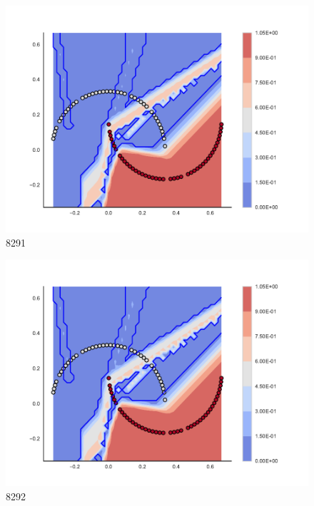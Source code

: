\begin{subfigure}[b]{0.09\textwidth}
    \includegraphics[clip, trim=2.35cm 1.75cm 4.5cm 0cm,width=\textwidth]{img/convergence/8291.pdf}
    \caption{8291}
    \label{fig:convergence_8291}
\end{subfigure}
%
\begin{subfigure}[b]{0.09\textwidth}
    \includegraphics[clip, trim=2.35cm 1.75cm 4.5cm 0cm,width=\textwidth]{img/convergence/8292.pdf}
    \caption{8292}
    \label{fig:convergence_8292}
\end{subfigure}
%
